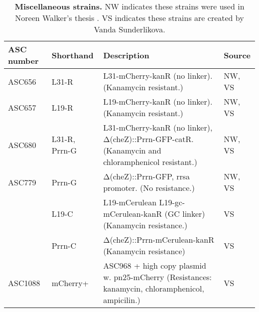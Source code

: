 \begin{table}[h]
    \begin{tabularx}{\textwidth}{llXl}
        \textbf{ASC number}	& \textbf{Shorthand} & \textbf{Description} & \textbf{Source}		\\
        \hline
        ASC656	& L31-R & L31-mCherry-kanR (no linker).	(Kanamycin resistant.) & NW, VS \\
        ASC657	& L19-R & L19-mCherry-kanR (no linker).	(Kanamycin resistant.) & NW, VS \\
        ASC680	& L31-R, Prrn-G & L31-mCherry-kanR (no linker), Δ(cheZ)::Prrn-GFP-catR. (Kanamycin and chloramphenicol resistant.)	& NW, VS \\
        ASC779	& Prrn-G& Δ(cheZ)::Prrn-GFP, rrsa promoter. (No resistance.) &	NW, VS \\
        
        \hline										
        & L19-C & 	L19-mCerulean L19-gc-mCerulean-kanR (GC linker)	(Kanamycin resistance.)	& VS \\
        & Prrn-C & 	Δ(cheZ)::Prrn-mCerulean-kanR	(Kanamycin resistance)	& VS \\
        \hline
        ASC1088 & mCherry+
        &	ASC968 + high copy plasmid w. pn25-mCherry (Resistances: kanamycin, chloramphenicol, ampicilin.) & VS \\
        \hline
    \end{tabularx}
    \caption{\textbf{Miscellaneous strains.} NW indicates these strains were used in Noreen Walker's thesis \cite{Walker2016t}. VS indicates these strains are created by Vanda Sunderlikova.}
    \label{table:ribo:strains2}
\end{table}




